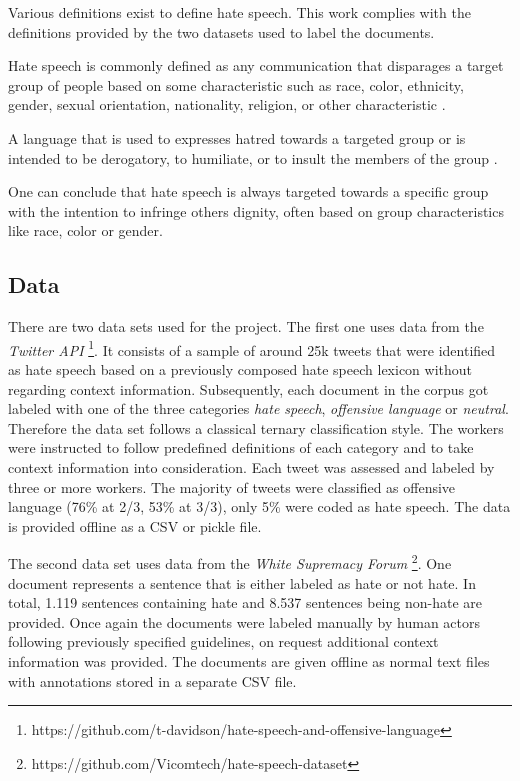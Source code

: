 Various definitions exist to define hate speech. This work complies with the definitions provided by the two datasets used to label the documents. 

\begin{defStrich}
	Hate speech is commonly defined as any communication that disparages a target group of people based on some characteristic such as race, color, ethnicity, gender, sexual orientation, nationality, religion, or other characteristic \cite{DeGibert2020}.
\end{defStrich}

\begin{defStrich}
	A language that is used to expresses hatred towards a targeted group or is intended to be derogatory, to humiliate, or to insult the members of the group \cite{ThomasDavidson2020}.
\end{defStrich}

One can conclude that hate speech is always targeted towards a specific group with the intention to infringe others dignity, often based on group characteristics like race, color or gender. 

\subsection{Data}
\label{ch:approachD}

There are two data sets used for the project. The first one uses data from the \textit{Twitter API} \cite{ThomasDavidson2020}\footnote{https://github.com/t-davidson/hate-speech-and-offensive-language}. It consists of a sample of around 25k tweets that were identified as hate speech based on a previously composed hate speech lexicon without regarding context information. Subsequently, each document in the corpus got labeled with one of the three categories \textit{hate speech}, \textit{offensive language} or \textit{neutral}. Therefore the data set follows a classical ternary clas\-si\-fi\-ca\-tion style. The workers were instructed to follow predefined definitions of each category and to take context information into consideration. Each tweet was assessed and labeled by three or more workers. The majority of tweets were classified as offensive language (76\% at 2/3, 53\% at 3/3), only 5\% were coded as hate speech. The data is provided offline as a CSV or pickle file. 

The second data set uses data from the \textit{White Supremacy Forum} \cite{DeGibert2020}\footnote{https://github.com/Vicomtech/hate-speech-dataset}. One document represents a sentence that is either labeled as hate or not hate. In total, 1.119 sentences containing hate and 8.537 sentences being non-hate are provided. Once again the documents were labeled manually by human actors following previously specified guidelines, on request additional context information was provided. The documents are given offline as normal text files with annotations stored in a separate CSV file. 

